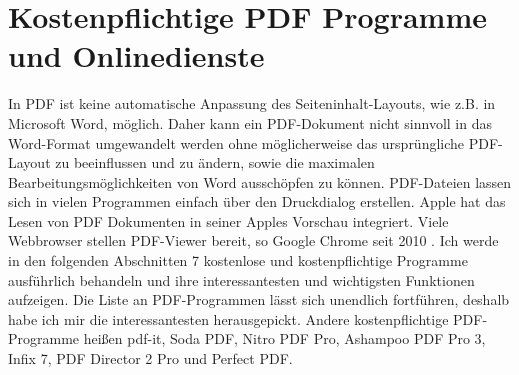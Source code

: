 \section{Kostenpflichtige PDF Programme und Onlinedienste}
In PDF ist keine automatische Anpassung des Seiteninhalt-Layouts, wie z.B. in Microsoft Word, möglich. Daher kann ein PDF-Dokument nicht sinnvoll in das Word-Format umgewandelt werden ohne möglicherweise das ursprüngliche PDF-Layout zu beeinflussen und zu ändern, sowie die maximalen Bearbeitungsmöglichkeiten von Word ausschöpfen zu können. PDF-Dateien lassen sich in vielen Programmen einfach über den Druckdialog erstellen. Apple hat das Lesen von PDF Dokumenten in seiner Apples Vorschau integriert. Viele Webbrowser stellen PDF-Viewer bereit, so Google Chrome seit 2010 \cite{wiki-pdf-de}. Ich werde in den folgenden Abschnitten 7 kostenlose und kostenpflichtige Programme ausführlich behandeln und ihre interessantesten und wichtigsten Funktionen aufzeigen. Die Liste an PDF-Programmen lässt sich unendlich fortführen, deshalb habe ich mir die interessantesten herausgepickt. Andere kostenpflichtige PDF-Programme heißen pdf-it, Soda PDF, Nitro PDF Pro, Ashampoo PDF Pro 3, Infix 7, PDF Director 2 Pro und Perfect PDF.

